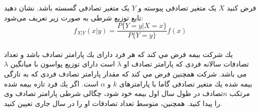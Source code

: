 \problem{}
\subproblem{}
فرض کنید $X$ یک متغیر تصادفی پیوسته و $Y$ 
یک متغیر تصادفی گسسته باشد. نشان دهید تابع توزیع شرطی به صورت زیر تعریف می‌شود:
\[
f_{X|Y}(x|y) =
\frac{P\{Y = y|X = x\}}{P\{Y = y\}} f(x)
\]\\
\subproblem{}
 يك شركت بيمه فرض مي كند كه هر فرد دارای يك پارامتر تصادف باشد و تعداد تصادفات سالانه فردی كه پارامتر تصادف او $\lambda$ است دارای توزيع پواسون با ميانگين $\lambda$
می باشد. شركت همچنين فرض مي كند كه مقدار پارامتر تصادف فردی كه به تازگی بيمه شده يك متغير تصادفی گاما با پارامترهای $k$ و $\alpha$ است. اگر يك فرد تازه بيمه شده مرتكب $n$تصادف در طول سال اول بيمه خود شود، چگالی شرطی پارامتر تصادف وی
را پيدا كنيد. همچنين، متوسط تعداد تصادفات او را در سال جاری تعيين كنيد.
